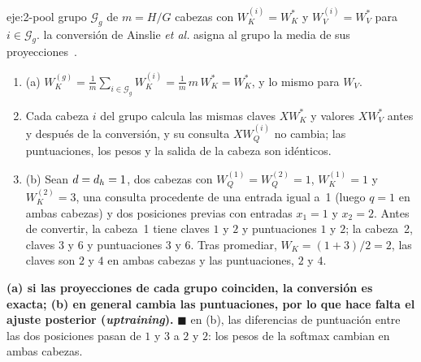 \begin{solucion}{eje:2-pool}
\datos grupo $\mathcal G_g$ de $m=H/G$ cabezas con $W_K^{(i)}=W_K^{\ast}$ y $W_V^{(i)}=W_V^{\ast}$ para $i\in\mathcal G_g$.
\planteamiento la conversión de Ainslie \emph{et al.} asigna al grupo la media de sus proyecciones~\cite[§2.1]{gqa}.
\pasos
\begin{enumerate}[label=\arabic*.]
  \item (a) $W_K^{(g)}=\frac1m\sum_{i\in\mathcal G_g}W_K^{(i)}=\frac1m\,m\,W_K^{\ast}=W_K^{\ast}$, y lo mismo para $W_V$.
  \item Cada cabeza $i$ del grupo calcula las mismas claves $XW_K^{\ast}$ y valores $XW_V^{\ast}$ antes y después de la conversión, y su consulta $XW_Q^{(i)}$ no cambia; las puntuaciones, los pesos y la salida de la cabeza son idénticos.
  \item (b) Sean $d=d_{h}=1$, dos cabezas con $W_Q^{(1)}=W_Q^{(2)}=1$, $W_K^{(1)}=1$ y $W_K^{(2)}=3$, una consulta procedente de una entrada igual a~1 (luego $q=1$ en ambas cabezas) y dos posiciones previas con entradas $x_1=1$ y $x_2=2$. Antes de convertir, la cabeza~1 tiene claves $1$ y $2$ y puntuaciones $1$ y $2$; la cabeza~2, claves $3$ y $6$ y puntuaciones $3$ y $6$. Tras promediar, $W_K=(1+3)/2=2$, las claves son $2$ y $4$ en ambas cabezas y las puntuaciones, $2$ y $4$.
\end{enumerate}
\resultado \textbf{(a) si las proyecciones de cada grupo coinciden, la conversión es exacta; (b) en general cambia las puntuaciones, por lo que hace falta el ajuste posterior (\emph{uptraining}).} $\blacksquare$
\comprobacion en (b), las diferencias de puntuación entre las dos posiciones pasan de $1$ y $3$ a $2$ y $2$: los pesos de la softmax cambian en ambas cabezas.
\end{solucion}

